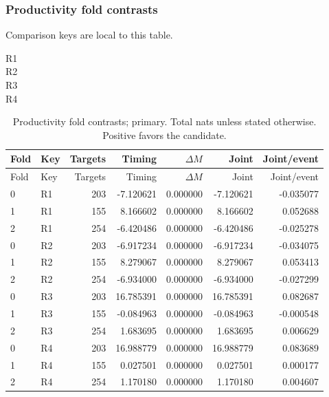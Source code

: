 \subsubsection{Productivity fold contrasts}
Comparison keys are local to this table. 
\begin{description}
\item[R1] 
\item[R2] 
\item[R3] 
\item[R4] 
\end{description}

{\small
\setlength{\tabcolsep}{3pt}
\begin{longtable}{llrrrrr}
\caption{Productivity fold contrasts; primary. Total nats unless stated otherwise. Positive favors the candidate.}\label{tab:R-primary}\\
\toprule
Fold & Key & Targets & Timing & $\Delta M$ & Joint & Joint/event\\\midrule
\endfirsthead
\toprule
Fold & Key & Targets & Timing & $\Delta M$ & Joint & Joint/event\\\midrule
\endhead
0 & R1 & 203 & -7.120621 & 0.000000 & -7.120621 & -0.035077\\
1 & R1 & 155 & 8.166602 & 0.000000 & 8.166602 & 0.052688\\
2 & R1 & 254 & -6.420486 & 0.000000 & -6.420486 & -0.025278\\
0 & R2 & 203 & -6.917234 & 0.000000 & -6.917234 & -0.034075\\
1 & R2 & 155 & 8.279067 & 0.000000 & 8.279067 & 0.053413\\
2 & R2 & 254 & -6.934000 & 0.000000 & -6.934000 & -0.027299\\
0 & R3 & 203 & 16.785391 & 0.000000 & 16.785391 & 0.082687\\
1 & R3 & 155 & -0.084963 & 0.000000 & -0.084963 & -0.000548\\
2 & R3 & 254 & 1.683695 & 0.000000 & 1.683695 & 0.006629\\
0 & R4 & 203 & 16.988779 & 0.000000 & 16.988779 & 0.083689\\
1 & R4 & 155 & 0.027501 & 0.000000 & 0.027501 & 0.000177\\
2 & R4 & 254 & 1.170180 & 0.000000 & 1.170180 & 0.004607\\
\bottomrule
\end{longtable}
}


